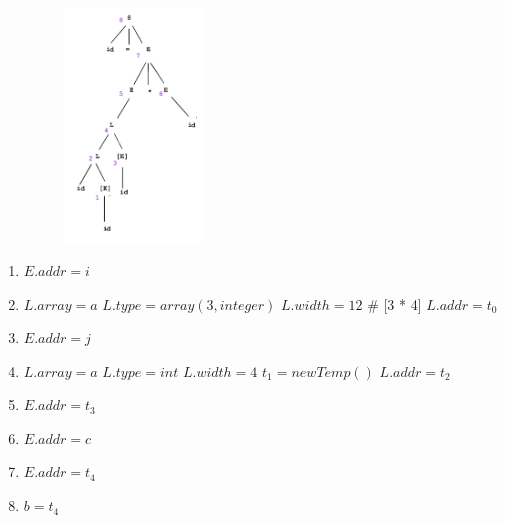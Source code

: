 \documentclass[11pt]{article}
\begin{document}
\begin{center}
  \begin{minipage}[t]{\linewidth}
    \begin{multicols}{3}
      \begin{figure}[H]
        \includegraphics[height=6.2cm, width=5cm]{./img/05DerivationTree.png}
      \end{figure}
      \begin{enumerate}
        \small 
        \item $E.addr = i$
        \item $L.array = a$ 
        \newline $L.type = array(3, integer)$
        \newline $L.width = 12$ {\color{teal} \quad \# [3 * 4]}
        \newline $L.addr = t_0$
        \item $E.addr = j$
        \item $L.array = a$
        \newline $L.type = int$
        \newline $L.width = 4$
        \newline $t_1 = newTemp()$
        \newline $L.addr = t_2$
        \item $E.addr = t_3$
        \item $E.addr = c$
        \item $E.addr = t_4$
        \item {\color{red} $b = t_4$}
      \end{enumerate}
    \end{multicols}
  \end{minipage}
\end{center}
\end{document}
